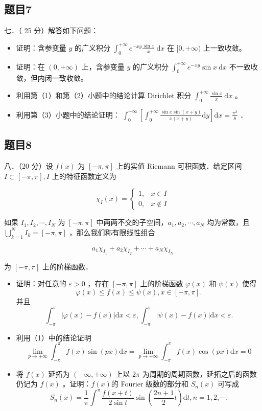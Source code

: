 \documentclass{article}
\begin{document}
\subsection{题目7}
七．（ 25 分）解答如下问题：

\begin{itemize}
  \item[（1）] 证明：含参变量 \(y\) 的广义积分 \(\int_{0}^{+\infty} e^{-x y} \frac{\sin x}{x} \mathrm{~d} x\) 在 \([0,+\infty)\) 上一致收敛。
  \item[（2）] 证明：在 \((0,+\infty)\) 上，含参变量 \(y\) 的广义积分 \(\int_{0}^{+\infty} e^{-x y} \sin x \mathrm{~d} x\) 不一致收敛，但内闭一致收敛。
  \item[（3）] 利用第（1）和第（2）小题中的结论计算 Dirichlet 积分 \(\int_{0}^{+\infty} \frac{\sin x}{x} \mathrm{~d} x\) 。
  \item[（4）] 利用第（3）小题中的结论证明： \(\int_{0}^{+\infty}\left[\int_{0}^{+\infty} \frac{\sin x \sin (x+y)}{x(x+y)} \mathrm{d} y\right] \mathrm{d} x=\frac{\pi^{2}}{8}\) ．
\end{itemize}

\subsection{题目8}
八．（20 分）设 \(f(x)\) 为 \([-\pi, \pi]\) 上的实值 Riemann 可积函数．给定区间 \(I \subset[-\pi, \pi], I\) 上的特征函数定义为

\[
\chi_{I}(x)= \begin{cases}1, & x \in I \\ 0, & x \notin I\end{cases}
\]

如果 \(I_{1}, I_{2}, \cdots, I_{N}\) 为 \([-\pi, \pi]\) 中两两不交的子空间，\(a_{1}, a_{2}, \cdots, a_{N}\) 均为常数，且 \(\bigcup_{k=1}^{N} I_{k}=[-\pi, \pi]\) ，那么我们称有限线性组合

\[
a_{1} \chi_{I_{1}}+a_{2} \chi_{I_{2}}+\cdots+a_{N} \chi_{I_{N}}
\]

为 \([-\pi, \pi]\) 上的阶梯函数．

\begin{itemize}
  \item[（1）] 证明：对任意的 \(\varepsilon>0\) ，存在 \([-\pi, \pi]\) 上的阶梯函数 \(\varphi(x)\) 和 \(\psi(x)\) 使得
\[
\varphi(x) \leq f(x) \leq \psi(x), x \in[-\pi, \pi] .
\]
并且
\[
\int_{-\pi}^{\pi}|\varphi(x)-f(x)| \mathrm{d} x<\varepsilon, \int_{-\pi}^{\pi}|\psi(x)-f(x)| \mathrm{d} x<\varepsilon .
\]
  \item[（2）] 利用（1）中的结论证明
\[
\lim _{p \rightarrow+\infty} \int_{-\pi}^{\pi} f(x) \sin (p x) \mathrm{d} x=\lim _{p \rightarrow+\infty} \int_{-\pi}^{\pi} f(x) \cos (p x) \mathrm{d} x=0
\]
  \item[（3）] 将 \(f(x)\) 延拓为 \((-\infty,+\infty)\) 上以 \(2 \pi\) 为周期的周期函数，延拓之后的函数仍记为 \(f(x)\) 。证明：\(f(x)\)的 Fourier 级数的部分和 \(S_{n}(x)\) 可写成
\[
S_{n}(x)=\frac{1}{\pi} \int^{\pi} \frac{f(x+t)}{2 \sin \underline{t}} \sin \left(\frac{2 n+1}{2} t\right) \mathrm{d} t, n=1,2, \cdots .
\]
\end{itemize}
\end{document}
